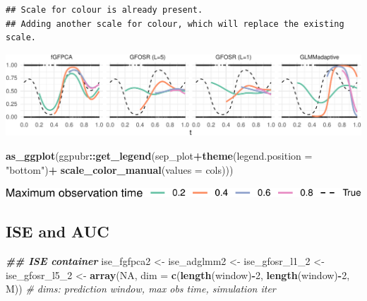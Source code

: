 \documentclass[
]{article}
\newenvironment{Shaded}{\begin{snugshade}}{\end{snugshade}}
\newcommand{\AttributeTok}[1]{\textcolor[rgb]{0.13,0.29,0.53}{#1}}
\newcommand{\CommentTok}[1]{\textcolor[rgb]{0.56,0.35,0.01}{\textit{#1}}}
\newcommand{\ConstantTok}[1]{\textcolor[rgb]{0.56,0.35,0.01}{#1}}
\newcommand{\DecValTok}[1]{\textcolor[rgb]{0.00,0.00,0.81}{#1}}
\newcommand{\DocumentationTok}[1]{\textcolor[rgb]{0.56,0.35,0.01}{\textbf{\textit{#1}}}}
\newcommand{\FunctionTok}[1]{\textcolor[rgb]{0.13,0.29,0.53}{\textbf{#1}}}
\newcommand{\NormalTok}[1]{#1}
\newcommand{\OtherTok}[1]{\textcolor[rgb]{0.56,0.35,0.01}{#1}}
\newcommand{\SpecialCharTok}[1]{\textcolor[rgb]{0.81,0.36,0.00}{\textbf{#1}}}
\newcommand{\StringTok}[1]{\textcolor[rgb]{0.31,0.60,0.02}{#1}}
\begin{document}
\begin{verbatim}
## Scale for colour is already present.
## Adding another scale for colour, which will replace the existing scale.
\end{verbatim}

\includegraphics{manuscript_files/figure-latex/fig_small_sim_pre-1.pdf}

\begin{Shaded}
\begin{Highlighting}[]
\FunctionTok{as\_ggplot}\NormalTok{(ggpubr}\SpecialCharTok{::}\FunctionTok{get\_legend}\NormalTok{(sep\_plot}\SpecialCharTok{+}\FunctionTok{theme}\NormalTok{(}\AttributeTok{legend.position =} \StringTok{"bottom"}\NormalTok{)}\SpecialCharTok{+}
                               \FunctionTok{scale\_color\_manual}\NormalTok{(}\AttributeTok{values =}\NormalTok{ cols)))}
\end{Highlighting}
\end{Shaded}

\includegraphics{manuscript_files/figure-latex/legend-1.pdf}

\subsection{ISE and AUC}\label{ise-and-auc-1}

\begin{Shaded}
\begin{Highlighting}[]
\DocumentationTok{\#\# ISE container }
\NormalTok{ise\_fgfpca2 }\OtherTok{\textless{}{-}}\NormalTok{ ise\_adglmm2 }\OtherTok{\textless{}{-}}\NormalTok{ ise\_gfosr\_l1\_2 }\OtherTok{\textless{}{-}}\NormalTok{ ise\_gfosr\_l5\_2 }\OtherTok{\textless{}{-}} 
  \FunctionTok{array}\NormalTok{(}\ConstantTok{NA}\NormalTok{, }\AttributeTok{dim =} \FunctionTok{c}\NormalTok{(}\FunctionTok{length}\NormalTok{(window)}\SpecialCharTok{{-}}\DecValTok{2}\NormalTok{, }\FunctionTok{length}\NormalTok{(window)}\SpecialCharTok{{-}}\DecValTok{2}\NormalTok{, M))}
\CommentTok{\# dims: prediction window, max obs time, simulation iter}
\end{Highlighting}
\end{Shaded}
\end{document}
